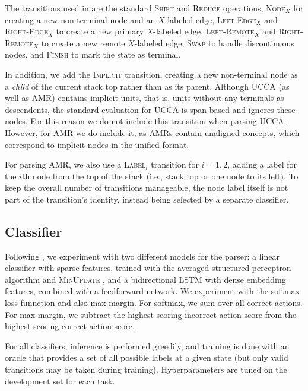 \documentclass[11pt,a4paper]{article}
\begin{document}
The transitions used in \citet{hershcovich2017a} are
the standard \textsc{Shift} and \textsc{Reduce} operations,
\textsc{Node$_X$} for creating a new non-terminal node and an $X$-labeled edge,
\textsc{Left-Edge$_X$} and \textsc{Right-Edge$_X$} to create a new primary $X$-labeled edge,
\textsc{Left-Remote$_X$} and \textsc{Right-Remote$_X$} to create a new remote $X$-labeled edge,
\textsc{Swap} to handle discontinuous nodes,
and \textsc{Finish} to mark the state as terminal.

In addition, we add the \textsc{Implicit} transition, creating a new non-terminal
node as a \textit{child} of the current stack top rather than as its parent.
Although UCCA (as well as AMR) contains implicit units, that is, units without
any terminals as descendents,
the standard evaluation for UCCA \cite{hershcovich2017a} is span-based and
ignores these nodes.
For this reason we do not include this transition when parsing UCCA.
However, for AMR we do include it, as AMRs contain unaligned concepts,
which correspond to implicit nodes in the unified format.

For parsing AMR, we also use a \textsc{Label$_i$} transition for $i=1,2$,
adding a label for the $i$th node from the top of the stack
(i.e., stack top or one node to its left).
To keep the overall number of transitions manageable,
the node label itself is not part of the transition's identity,
instead being selected by a separate classifier.

\subsection{Classifier}\label{sec:classifier}
Following \citet{hershcovich2017a}, we experiment with two different models for the parser:
a linear classifier with sparse features, trained with the averaged structured perceptron algorithm
\cite{Coll:04} and \textsc{MinUpdate} \cite{goldberg2011learning},
and a bidirectional LSTM with dense embedding features,
combined with a feedforward network.
We experiment with the softmax loss funnction and also max-margin.
For softmax, we sum over all correct actions.
For max-margin, we subtract the highest-scoring incorrect action score
from the highest-scoring correct action score.

For all classifiers, inference is performed greedily,
and training is done with an oracle that provides a set of all possible labels at a given state
(but only valid transitions may be taken during training).
Hyperparameters are tuned on the development set for each task.
\end{document}
